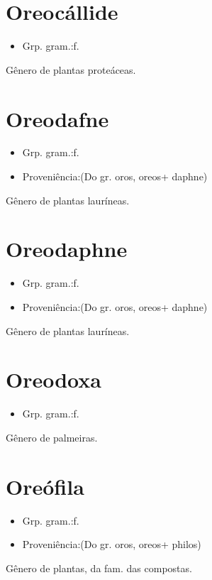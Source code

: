 \section{Oreocállide}
\begin{itemize}
\item {Grp. gram.:f.}
\end{itemize}
Gênero de plantas proteáceas.
\section{Oreodafne}
\begin{itemize}
\item {Grp. gram.:f.}
\end{itemize}
\begin{itemize}
\item {Proveniência:(Do gr. \textunderscore oros\textunderscore , \textunderscore oreos\textunderscore  + \textunderscore daphne\textunderscore )}
\end{itemize}
Gênero de plantas lauríneas.
\section{Oreodaphne}
\begin{itemize}
\item {Grp. gram.:f.}
\end{itemize}
\begin{itemize}
\item {Proveniência:(Do gr. \textunderscore oros\textunderscore , \textunderscore oreos\textunderscore  + \textunderscore daphne\textunderscore )}
\end{itemize}
Gênero de plantas lauríneas.
\section{Oreodoxa}
\begin{itemize}
\item {Grp. gram.:f.}
\end{itemize}
Gênero de palmeiras.
\section{Oreófila}
\begin{itemize}
\item {Grp. gram.:f.}
\end{itemize}
\begin{itemize}
\item {Proveniência:(Do gr. \textunderscore oros\textunderscore , \textunderscore oreos\textunderscore  + \textunderscore philos\textunderscore )}
\end{itemize}
Gênero de plantas, da fam. das compostas.
